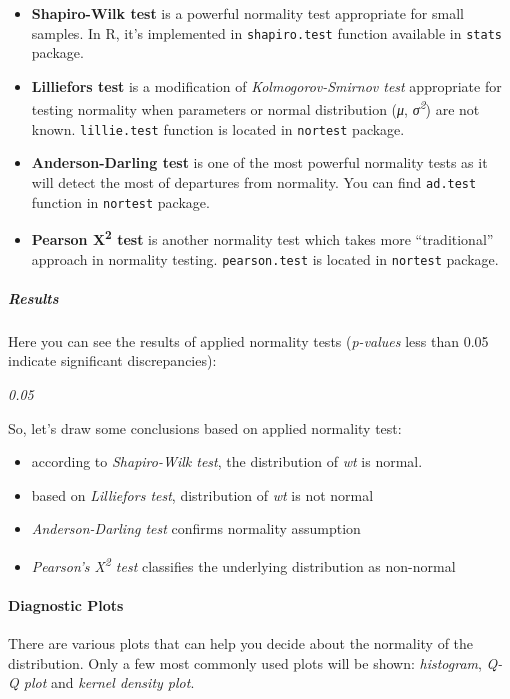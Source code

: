 \documentclass[]{article}
\begin{document}
\begin{itemize}
\item
  \textbf{Shapiro-Wilk test} is a powerful normality test appropriate
  for small samples. In R, it's implemented in \texttt{shapiro.test}
  function available in \texttt{stats} package.
\item
  \textbf{Lilliefors test} is a modification of \emph{Kolmogorov-Smirnov
  test} appropriate for testing normality when parameters or normal
  distribution (\emph{μ}, \emph{σ\textsuperscript{2}}) are not known.
  \texttt{lillie.test} function is located in \texttt{nortest} package.
\item
  \textbf{Anderson-Darling test} is one of the most powerful normality
  tests as it will detect the most of departures from normality. You can
  find \texttt{ad.test} function in \texttt{nortest} package.
\item
  \textbf{Pearson Χ\textsuperscript{2} test} is another normality test
  which takes more ``traditional'' approach in normality testing.
  \texttt{pearson.test} is located in \texttt{nortest} package.
\end{itemize}
\subparagraph{Results}

Here you can see the results of applied normality tests (\emph{p-values}
less than 0.05 indicate significant discrepancies):

\emph{0.05}

So, let's draw some conclusions based on applied normality test:

\begin{itemize}
\item
  according to \emph{Shapiro-Wilk test}, the distribution of \emph{wt}
  is normal.
\item
  based on \emph{Lilliefors test}, distribution of \emph{wt} is not
  normal
\item
  \emph{Anderson-Darling test} confirms normality assumption
\item
  \emph{Pearson's Χ\textsuperscript{2} test} classifies the underlying
  distribution as non-normal
\end{itemize}
\paragraph{Diagnostic Plots}

There are various plots that can help you decide about the normality of
the distribution. Only a few most commonly used plots will be shown:
\emph{histogram}, \emph{Q-Q plot} and \emph{kernel density plot}.
\end{document}
